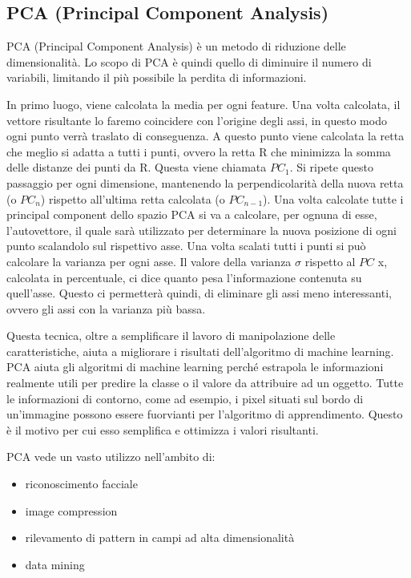 \documentclass[12pt,italian]{report}
\begin{document}
\subsection{PCA (Principal Component Analysis)}
PCA (Principal Component Analysis) è un metodo di riduzione delle dimensionalità. Lo scopo di PCA è quindi quello di diminuire il numero di variabili, limitando il più possibile la perdita di informazioni. 

In primo luogo, viene calcolata la media per ogni feature. Una volta calcolata, il vettore risultante lo faremo coincidere con l'origine degli assi, in questo modo ogni punto verrà traslato di conseguenza. A questo punto viene calcolata la retta che meglio si adatta a tutti i punti, ovvero la retta R che minimizza la somma delle distanze dei punti da R. Questa viene chiamata $ PC_{1} $. Si ripete questo passaggio per ogni dimensione, mantenendo la perpendicolarità della nuova retta (o $ PC_{n} $) rispetto all'ultima retta calcolata (o $ PC_{n-1} $). 
Una volta calcolate tutte i principal component dello spazio PCA si va a calcolare, per ognuna di esse, l'autovettore, il quale sarà utilizzato per determinare la nuova posizione di ogni punto scalandolo sul rispettivo asse. Una volta scalati tutti i punti si può calcolare la varianza per ogni asse. Il valore della varianza $\sigma$ rispetto al $ PC $ x, calcolata in percentuale, ci dice quanto pesa l'informazione contenuta su quell'asse. Questo ci permetterà quindi, di eliminare gli assi meno interessanti, ovvero gli assi con la varianza più bassa. 

Questa tecnica, oltre a semplificare il lavoro di manipolazione delle caratteristiche, aiuta a migliorare i risultati dell'algoritmo di machine learning. PCA aiuta gli algoritmi di machine learning perché estrapola le informazioni realmente utili per predire la classe o il valore da attribuire ad un oggetto. Tutte le informazioni di contorno, come ad esempio, i pixel situati sul bordo di un'immagine possono essere fuorvianti per l'algoritmo di apprendimento. Questo è il motivo per cui esso semplifica e ottimizza i valori risultanti.

PCA vede un vasto utilizzo nell'ambito di:
\begin{itemize}
	\item riconoscimento facciale
	\item image compression
	\item rilevamento di pattern in campi ad alta dimensionalità
	\item data mining
\end{itemize}
\end{document}
